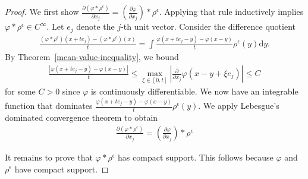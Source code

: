 \begin{proof}
    We first show \(\frac{\partial (\varphi * \rho^{\epsilon})}{\partial x_j} = \left(\frac{\partial \varphi}{\partial x_j}\right) * \rho^{\epsilon}\). Applying that rule inductively implies \(\varphi * \rho^{\epsilon} \in C^{\infty}\). Let \(e_j\) denote the \(j\)-th unit vector. Consider the difference quotient
    \begin{align*}
        \frac{(\varphi * \rho^\epsilon)(x + te_j) - (\varphi * \rho^\epsilon)(x)}{t} = \int \frac{\varphi(x+te_j - y) - \varphi(x-y)}{t}\rho^{\epsilon}(y) \mathrm{d}y.
    \end{align*}
    By Theorem~\ref{mean-value-inequality}, we bound
    \begin{align*}
        \frac{|\varphi (x + te_j - y) - \varphi (x-y)|}{t} \leq \max_{\xi \in [0,t]}\left |\frac{\partial}{\partial x_j}\varphi(x - y + \xi e_j) \right | \leq C
    \end{align*}
    for some \(C > 0\) since \({\varphi}\) is continuously differentiable. We now have an integrable function that dominates \(\frac{\varphi(x+te_j - y) - \varphi(x-y)}{t}\rho^{\epsilon}(y)\). We apply Lebesgue's dominated convergence theorem to obtain 
    \begin{align*}
        \frac{\partial (\varphi * \rho^{\epsilon})}{\partial x_j} = \left(\frac{\partial \varphi}{\partial x_j}\right) * \rho^{\epsilon}
    \end{align*}

    It remains to prove that \(\varphi * \rho^{\epsilon}\) has compact support. This follows because \({\varphi}\) and \(\rho^{\epsilon}\) have compact support.


\end{proof}

